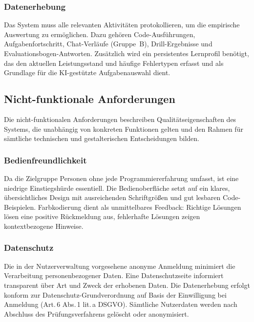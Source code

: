 \subsubsection{Datenerhebung}

Das System muss alle relevanten Aktivitäten protokollieren, um die empirische Auswertung zu ermöglichen.
Dazu gehören Code-Ausführungen, Aufgabenfortschritt, Chat-Verläufe (Gruppe~B), Drill-Ergebnisse und Evaluationsbogen-Antworten.
Zusätzlich wird ein persistentes Lernprofil benötigt, das den aktuellen Leistungsstand und häufige Fehlertypen erfasst und als Grundlage für die KI-gestützte Aufgabenauswahl dient.


\subsection{Nicht-funktionale Anforderungen}\label{subsec:nichtfunktional}

Die nicht-funktionalen Anforderungen beschreiben Qualitätseigenschaften des Systems, die unabhängig von konkreten Funktionen gelten und den Rahmen für sämtliche technischen und gestalterischen Entscheidungen bilden.

\subsubsection{Bedienfreundlichkeit}

Da die Zielgruppe Personen ohne jede Programmiererfahrung umfasst, ist eine niedrige Einstiegshürde essentiell.
Die Bedienoberfläche setzt auf ein klares, übersichtliches Design mit ausreichenden Schriftgrößen und gut lesbaren Code-Beispielen.
Farbkodierung dient als unmittelbares Feedback: Richtige Lösungen lösen eine positive Rückmeldung aus, fehlerhafte Lösungen zeigen kontextbezogene Hinweise.

\subsubsection{Datenschutz}

Die in der Nutzerverwaltung vorgesehene anonyme Anmeldung minimiert die Verarbeitung personenbezogener Daten.
Eine Datenschutzseite informiert transparent über Art und Zweck der erhobenen Daten.
Die Datenerhebung erfolgt konform zur Datenschutz-Grundverordnung \cite{dsgvo} auf Basis der Einwilligung bei Anmeldung (Art.\,6 Abs.\,1 lit.\,a DSGVO).
Sämtliche Nutzerdaten werden nach Abschluss des Prüfungsverfahrens gelöscht oder anonymisiert.

